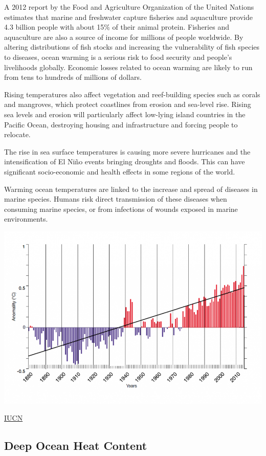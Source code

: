 \documentclass[
]{book}
\begin{document}
A 2012 report by the Food and Agriculture Organization of the United Nations estimates that marine and freshwater capture fisheries and aquaculture provide 4.3 billion people with about 15\% of their animal protein. Fisheries and aquaculture are also a source of income for millions of people worldwide. By altering distributions of fish stocks and increasing the vulnerability of fish species to diseases, ocean warming is a serious risk to food security and people's livelihoods globally. Economic losses related to ocean warming are likely to run from tens to hundreds of millions of dollars.

Rising temperatures also affect vegetation and reef-building species such as corals and mangroves, which protect coastlines from erosion and sea-level rise. Rising sea levels and erosion will particularly affect low-lying island countries in the Pacific Ocean, destroying housing and infrastructure and forcing people to relocate.

The rise in sea surface temperatures is causing more severe hurricanes and the intensification of El Niño events bringing droughts and floods. This can have significant socio-economic and health effects in some regions of the world.

Warming ocean temperatures are linked to the increase and spread of diseases in marine species. Humans risk direct transmission of these diseases when consuming marine species, or from infections of wounds exposed in marine environments.

\includegraphics{fig/sea_surface_tmp.png}

\href{https://www.iucn.org/resources/issues-briefs/ocean-warming}{IUCN}

\hypertarget{deep-ocean-heat-content}{%
\subsection{Deep Ocean Heat Content}\label{deep-ocean-heat-content}}
\end{document}
